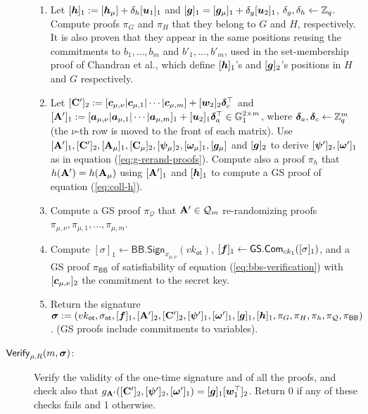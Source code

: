 \begin{description}
\begin{enumerate}
\item Let $[{\boldsymbol{h}}]_1:=[{\boldsymbol{h}}_\mu]+\delta_h[{\boldsymbol{u}}_1]_1$ and $[{\boldsymbol{g}}]_1=[{\boldsymbol{g}}_\mu]_1+\delta_g[{\boldsymbol{u}}_2]_1$, $\delta_g,\delta_h\gets\mathbb{Z}_q$. Compute proofs $\pi_G$ and $\pi_H$ that they belong to $G$ and $H$, respectively. It is also proven that they appear in the same positions reusing the commitments to $b_1,\ldots,b_{m}$ and $b'_1,\ldots,b'_{m}$, used in the set-membership proof of Chandran et al., which define $[{\boldsymbol{h}}]_1$'s and $[{\boldsymbol{g}}]_2$'s positions in $H$ and $G$ respectively.

\item Let
$
[\mathbf{{C}}']_2:=[{\boldsymbol{c}}_{\mu,\nu}|{\boldsymbol{c}}_{\mu,1}|\cdots|{\boldsymbol{c}}_{\mu,m}]+[{\boldsymbol{w}}_2]_2{\boldsymbol{\delta}}_c^\top$ and $[\mathbf{{A}}']_1:=[{\boldsymbol{a}}_{\mu,\nu} |\allowbreak {\boldsymbol{a}}_{\mu,1} | \cdots |{\boldsymbol{a}}_{\mu,m}]_1+[{\boldsymbol{u}}_2]_1{\boldsymbol{\delta}}_a^\top\in\mathbb{G}^{2\times m}_1$, where ${\boldsymbol{\delta}}_a,{\boldsymbol{\delta}}_c\gets\mathbb{Z}_q^m$ (the $\nu$-th row is moved to the front of each matrix).
Use $[\mathbf{{A}}']_1,[\mathbf{{C}}']_2,[\mathbf{{A}}_\mu]_1,[\mathbf{{C}}_\mu]_2,[{\boldsymbol{\psi}}_\mu]_2,[{\boldsymbol{\omega}}_\mu]_1,[{\boldsymbol{g}}_\mu]$ and $[{\boldsymbol{g}}]_2$ to derive $[{\boldsymbol{\psi}}']_2,[{\boldsymbol{\omega}}']_1$ as in equation (\ref{eq:g-rerand-proofs}). Compute also a proof $\pi_h$ that $h(\mathbf{{A}}')=h(\mathbf{{A}}_\mu)$ using $[\mathbf{{A}}']_1$ and $[{\boldsymbol{h}}
]_1$ to compute a GS proof of equation (\ref{eq:coll-h}).
\item Compute a GS proof $\pi_{\mathcal{Q}}$ that $\mathbf{{A}}'\in \mathcal{Q}_m$ re-randomizing proofs $\pi_{\mu,\nu},\pi_{\mu,1},\allowbreak\ldots,\pi_{\mu,m}$.

\item Compute $[\sigma]_1\gets\mathsf{BB}.\mathsf{Sign}_{x_{\mu,\nu}}(vk_\mathsf{ot})$, $[{\boldsymbol{f}}]_1\gets{\mathsf{GS}}.\mathsf{Com}_{ck_1}([\sigma]_1)$, and a GS proof $\pi_\mathsf{BB}$ of satisfiability of equation (\ref{eq:bbs-verification}) with $[{\boldsymbol{c}}_{\mu,\nu}]_2$ the commitment to the secret key.

\item Return the signature ${\boldsymbol \sigma}:=(vk_\mathsf{ot},\sigma_\mathsf{ot},[{\boldsymbol{f}}]_1,[\mathbf{{A}}']_2,[\mathbf{{C}}']_2,[{\boldsymbol{\psi}}']_1,[{\boldsymbol{\omega}}']_1,[{\boldsymbol{g}}]_1,[{\boldsymbol{h}}]_1,\allowbreak\pi_G,\pi_H, \pi_h,\pi_{\mathcal{Q}},\pi_\mathsf{BB})$. (GS proofs include commitments to variables).
\end{enumerate}

\item[$\mathsf{Verify}_{\rho,R}(m,{\boldsymbol \sigma})$:] Verify the validity of the one-time signature and of all the proofs, and check also that $g_{\mathbf{{A}}'}([\mathbf{{C}}']_2,[{\boldsymbol{\psi}}']_2,[{\boldsymbol{\omega}}']_1) = [{\boldsymbol{g}}]_1[{\boldsymbol{w}}_1^\top]_2$. Return 0 if any of these checks fails and 1 otherwise.
\end{description}

